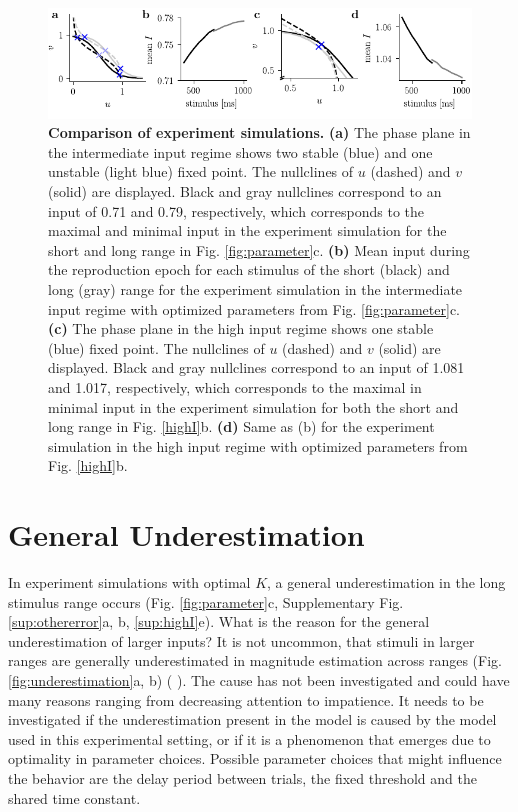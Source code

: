 \documentclass[10pt]{article}
\begin{document}
\begin{figure}[!htb]
	\centering
	\includegraphics{figures/supp_comparison.pdf}
	\caption{\textbf{Comparison of experiment simulations.}
	\textbf{(a)} The phase plane in the intermediate input regime shows two stable (blue) and one unstable (light blue) fixed point. The nullclines of $u$ (dashed) and $v$ (solid) are displayed. Black and gray nullclines correspond to an input of 0.71 and 0.79, respectively, which corresponds to the maximal and minimal input in the experiment simulation for the short and long range in Fig. \ref{fig:parameter}c.
	\textbf{(b)} Mean input during the reproduction epoch for each stimulus of the short (black) and long (gray) range for the experiment simulation in the intermediate input regime with optimized parameters from Fig. \ref{fig:parameter}c.
	\textbf{(c)} The phase plane in the high input regime shows one stable (blue) fixed point. The nullclines of $u$ (dashed) and $v$ (solid) are displayed. Black and gray nullclines correspond to an input of 1.081 and 1.017, respectively, which corresponds to the maximal in minimal input in the experiment simulation for both the short and long range in Fig. \ref{highI}b.
	\textbf{(d)} Same as (b) for the experiment simulation in the high input regime with optimized parameters from Fig. \ref{highI}b.
	}
\label{fig:comparison}
\end{figure}

\section{General Underestimation}
In experiment simulations with optimal $K$, a general underestimation in the long stimulus range occurs (Fig. \ref{fig:parameter}c, Supplementary Fig. \ref{sup:othererror}a, b, \ref{sup:highI}e).
What is the reason for the general underestimation of larger inputs? 
It is not uncommon, that stimuli in larger ranges are generally underestimated in magnitude estimation across ranges (Fig. \ref{fig:underestimation}a, b) (\cite{Henke2022} \cite{Petzschner2012}).  
The cause has not been investigated and could have many reasons ranging from decreasing attention to impatience. 
It needs to be investigated if the underestimation present in the model is caused by the model used in this experimental setting, or if it is a phenomenon that emerges due to optimality in parameter choices. %
Possible parameter choices that might influence the behavior are the delay period between trials, the fixed threshold and the shared time constant. 
\end{document}
